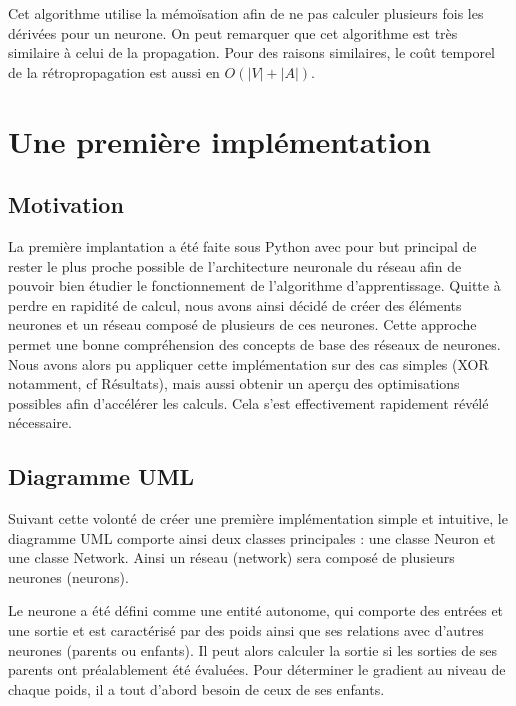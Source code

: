 \documentclass{report}
\begin{document}
Cet algorithme utilise la mémoïsation afin de ne pas calculer plusieurs fois les dérivées pour un neurone. On peut remarquer que cet algorithme est très similaire à celui de la propagation. Pour des raisons similaires, le coût temporel de la rétropropagation est aussi en $O(|V|+|A|)$.

\chapter{Une première implémentation}

\section{Motivation}

La première implantation a été faite sous Python avec pour but principal de rester le plus proche possible de l'architecture neuronale du réseau afin de pouvoir bien étudier le fonctionnement de l'algorithme d'apprentissage. Quitte à perdre en rapidité de calcul, nous avons ainsi décidé de créer des éléments neurones et un réseau composé de plusieurs de ces neurones. Cette approche permet une bonne compréhension des concepts de base des réseaux de neurones. Nous avons alors pu appliquer cette implémentation sur des cas simples (XOR notamment, cf Résultats), mais aussi obtenir un aperçu des optimisations possibles afin d'accélérer les calculs. Cela s'est effectivement rapidement révélé nécessaire.  

\section{Diagramme UML}

Suivant cette volonté de créer une première implémentation simple et intuitive, le diagramme UML comporte ainsi deux classes principales : une classe Neuron et une classe Network. Ainsi un réseau (network) sera composé de plusieurs neurones (neurons).

Le neurone a été défini comme une entité autonome, qui comporte des entrées et une sortie et est caractérisé par des poids ainsi que ses relations avec d'autres neurones (parents ou enfants). Il peut alors calculer la sortie si les sorties de ses parents ont préalablement été évaluées. Pour déterminer le gradient au niveau de chaque poids, il a tout d'abord besoin de ceux de ses enfants.
\end{document}
